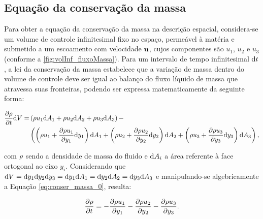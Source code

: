 \subsection{Equação da conservação da massa}

Para obter a equação da conservação da massa na descrição espacial, considera-se um volume de controle infinitesimal fixo no espaço, permeável à matéria e submetido a um escoamento com velocidade $\mathbf{u}$, cujos componentes são $u_1$, $u_2$ e $u_3$ (conforme a \autoref{fig:volInf_fluxoMassa}). Para um intervalo de tempo infinitesimal $\mathrm{d} t$, a lei da conservação da massa estabelece que a variação de massa dentro do volume de controle deve ser igual ao balanço do fluxo líquido de massa que atravessa suas fronteiras, podendo ser expressa matematicamente da seguinte forma:

\begin{align}
	\begin{split}
	\frac{\partial \rho}{\partial t}\mathrm{d} V =& \left(\rho u_1 \mathrm{d} A_{1}  +  \rho u_2 \mathrm{d} A_{2} + \rho u_3  \mathrm{d} A_{3} \right) - \\  &\left(\left(\rho u_1 + \frac{\partial \rho u_1}{\partial y_1}\mathrm{d} y_1 \right)\mathrm{d} A_{1} + \left(\rho u_2+ \frac{\partial \rho u_2}{\partial y_2}\mathrm{d} y_2 \right) \mathrm{d} A_{2} + \left(\rho u_3 + \frac{\partial \rho u_3}{\partial y_3}\mathrm{d} y_3 \right) \mathrm{d} A_{3}\right), \label{eq:conser_massa_0} 
	\end{split}
\end{align}

\noindent com $\rho$ sendo a densidade de massa do fluido e $\mathrm{d} A_{i}$ a área referente à face ortogonal ao eixo $y_i$. Considerando que $\mathrm{d} V = \mathrm{d} y_1 \mathrm{d} y_2 \mathrm{d} y_3 = \mathrm{d} y_1 \mathrm{d} A_1 = \mathrm{d} y_2 \mathrm{d} A_2 = \mathrm{d} y_3 \mathrm{d} A_3 $  e manipulando-se algebricamente a Equação \eqref{eq:conser_massa_0}, resulta:

\begin{align}
	\frac{\partial \rho}{\partial t} = - \frac{\partial \rho u_{1}}{\partial y_1} - \frac{\partial \rho u_{2}}{\partial y_2}- \frac{\partial \rho u_{3}}{\partial y_3}.
\end{align}

